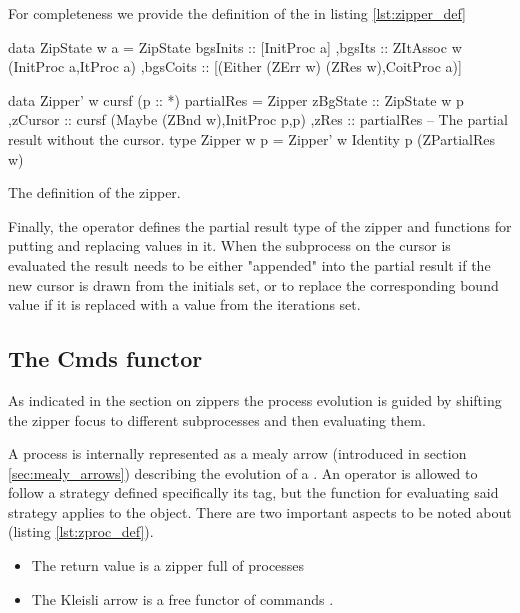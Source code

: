 For completeness we provide the definition of the  in
listing \ref{lst:zipper_def}

\begin{code}
\begin{haskellcode}
 data ZipState w a =
  ZipState
  { bgsInits :: [InitProc a]
   ,bgsIts :: ZItAssoc w (InitProc a,ItProc a)
   ,bgsCoits :: [(Either (ZErr w) (ZRes w),CoitProc a)]
  }

data Zipper' w cursf (p :: *) partialRes =
  Zipper
  { zBgState :: ZipState w p
   ,zCursor  :: cursf (Maybe (ZBnd w),InitProc p,p)
   ,zRes     :: partialRes -- The partial result without the cursor.
  }
type Zipper w p = Zipper' w Identity p (ZPartialRes w)
\end{haskellcode}
  \caption{\label{lst:zipper_def}The definition of the zipper.}
\end{code}

Finally, the operator defines the partial result type of the zipper
 and functions for putting and replacing values in
it. When the subprocess on the cursor is evaluated the result needs to
be either "appended" into the partial result if the new cursor is
drawn from the initials set, or to replace the corresponding bound
value if it is replaced with a value from the iterations set.

\subsection{The Cmds functor}
\label{sec:cmds_functor}

As indicated in the section on zippers the process evolution is guided
by shifting the zipper focus to different subprocesses and then
evaluating them.

A process is internally represented as a mealy arrow (introduced in
section \ref{sec:mealy_arrows}) describing the evolution of a
 . An operator is allowed to follow a strategy defined
specifically its  tag, but the function for
evaluating said strategy applies to the  object. There are
two important aspects to be noted about  (listing
\ref{lst:zproc_def}).

\begin{itemize}
\item The return value is a zipper full of processes 
\item The Kleisli arrow is a free functor of commands .
\end{itemize}

